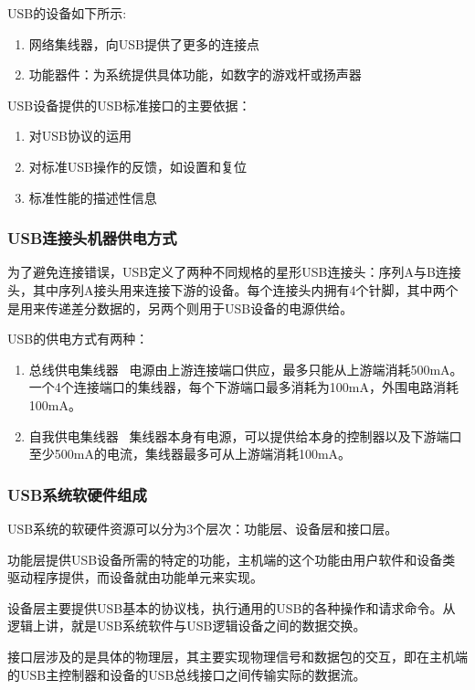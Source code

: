 
USB的设备如下所示: 
\begin{enumerate}
\item 网络集线器，向USB提供了更多的连接点

\item 功能器件：为系统提供具体功能，如数字的游戏杆或扬声器
\end{enumerate}

USB设备提供的USB标准接口的主要依据：     
\begin{enumerate}
\item 对USB协议的运用

\item 对标准USB操作的反馈，如设置和复位

\item 标准性能的描述性信息 
\end{enumerate}

\subsubsection{USB连接头机器供电方式}
为了避免连接错误，USB定义了两种不同规格的星形USB连接头：序列A与B连接头，其中序列A接头用来连接下游的设备。每个连接头内拥有4个针脚，其中两个是用来传递差分数据的，另两个则用于USB设备的电源供给。 

USB的供电方式有两种： 
\begin{enumerate}
\item 总线供电集线器 
电源由上游连接端口供应，最多只能从上游端消耗500mA。一个4个连接端口的集线器，每个下游端口最多消耗为100mA，外围电路消耗100mA。 
\item 自我供电集线器 
集线器本身有电源，可以提供给本身的控制器以及下游端口至少500mA的电流，集线器最多可从上游端消耗100mA。 
\end{enumerate}
\subsubsection{USB系统软硬件组成}
USB系统的软硬件资源可以分为3个层次：功能层、设备层和接口层。 

功能层提供USB设备所需的特定的功能，主机端的这个功能由用户软件和设备类驱动程序提供，而设备就由功能单元来实现。 

设备层主要提供USB基本的协议栈，执行通用的USB的各种操作和请求命令。从逻辑上讲，就是USB系统软件与USB逻辑设备之间的数据交换。 

接口层涉及的是具体的物理层，其主要实现物理信号和数据包的交互，即在主机端的USB主控制器和设备的USB总线接口之间传输实际的数据流。 

